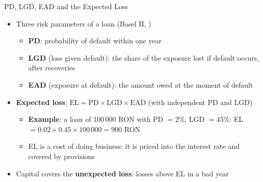\begin{frame}{PD, LGD, EAD and the Expected Loss}
\itemsize{\small}
\begin{itemize}
    \item Three risk parameters of a loan (Basel II, )
    \begin{itemize}
        \item \textbf{PD}: probability of default within one year
        \item \textbf{LGD} (loss given default): the share of the exposure lost if default occurs, after recoveries
        \item \textbf{EAD} (exposure at default): the amount owed at the moment of default
    \end{itemize}
    \item \textbf{Expected loss}: $\mathrm{EL} = \mathrm{PD} \times \mathrm{LGD} \times \mathrm{EAD}$ (with independent PD and LGD)
    \begin{itemize}
        \item \textbf{Example}: a loan of 100\,000 RON with PD $= 2\%$, LGD $= 45\%$: EL $= 0.02 \times 0.45 \times 100\,000 = 900$ RON
        \item EL is a cost of doing business: it is priced into the interest rate and covered by provisions
    \end{itemize}
    \item Capital covers the \textbf{unexpected loss}: losses above EL in a bad year
\end{itemize}
\end{frame}

